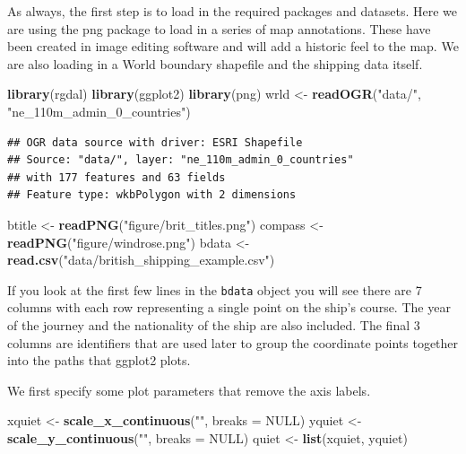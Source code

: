 \documentclass[]{article}
\newenvironment{Shaded}{}{}
\newcommand{\KeywordTok}[1]{\textcolor[rgb]{0.00,0.44,0.13}{\textbf{{#1}}}}
\newcommand{\DataTypeTok}[1]{\textcolor[rgb]{0.56,0.13,0.00}{{#1}}}
\newcommand{\StringTok}[1]{\textcolor[rgb]{0.25,0.44,0.63}{{#1}}}
\newcommand{\OtherTok}[1]{\textcolor[rgb]{0.00,0.44,0.13}{{#1}}}
\newcommand{\NormalTok}[1]{{#1}}
\begin{document}
As always, the first step is to load in the required packages and
datasets. Here we are using the png package to load in a series of map
annotations. These have been created in image editing software and will
add a historic feel to the map. We are also loading in a World boundary
shapefile and the shipping data itself.

\begin{Shaded}
\begin{Highlighting}[]
\KeywordTok{library}\NormalTok{(rgdal)}
\KeywordTok{library}\NormalTok{(ggplot2)}
\KeywordTok{library}\NormalTok{(png)}
\NormalTok{wrld <- }\KeywordTok{readOGR}\NormalTok{(}\StringTok{"data/"}\NormalTok{, }\StringTok{"ne_110m_admin_0_countries"}\NormalTok{)}
\end{Highlighting}
\end{Shaded}

\begin{verbatim}
## OGR data source with driver: ESRI Shapefile 
## Source: "data/", layer: "ne_110m_admin_0_countries"
## with 177 features and 63 fields
## Feature type: wkbPolygon with 2 dimensions
\end{verbatim}

\begin{Shaded}
\begin{Highlighting}[]
\NormalTok{btitle <- }\KeywordTok{readPNG}\NormalTok{(}\StringTok{"figure/brit_titles.png"}\NormalTok{)}
\NormalTok{compass <- }\KeywordTok{readPNG}\NormalTok{(}\StringTok{"figure/windrose.png"}\NormalTok{)}
\NormalTok{bdata <- }\KeywordTok{read.csv}\NormalTok{(}\StringTok{"data/british_shipping_example.csv"}\NormalTok{)}
\end{Highlighting}
\end{Shaded}

If you look at the first few lines in the \texttt{bdata} object you will
see there are 7 columns with each row representing a single point on the
ship's course. The year of the journey and the nationality of the ship
are also included. The final 3 columns are identifiers that are used
later to group the coordinate points together into the paths that
ggplot2 plots.

We first specify some plot parameters that remove the axis labels.

\begin{Shaded}
\begin{Highlighting}[]
\NormalTok{xquiet <- }\KeywordTok{scale_x_continuous}\NormalTok{(}\StringTok{""}\NormalTok{, }\DataTypeTok{breaks =} \OtherTok{NULL}\NormalTok{)}
\NormalTok{yquiet <- }\KeywordTok{scale_y_continuous}\NormalTok{(}\StringTok{""}\NormalTok{, }\DataTypeTok{breaks =} \OtherTok{NULL}\NormalTok{)}
\NormalTok{quiet <- }\KeywordTok{list}\NormalTok{(xquiet, yquiet)}
\end{Highlighting}
\end{Shaded}
\end{document}
